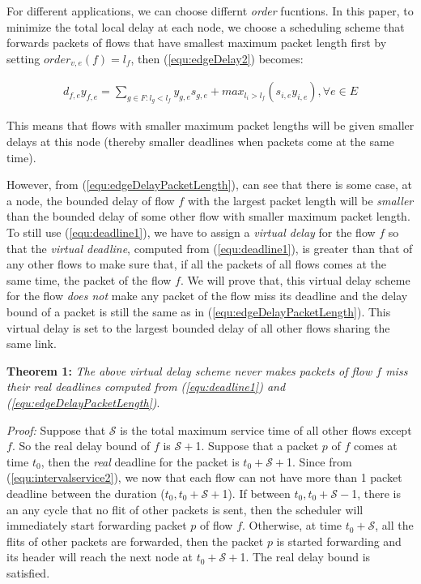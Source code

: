 \documentclass[conference, twocolumn]{IEEEtran}
\theoremstyle{definition}
\begin{document}
For different applications, we can choose differnt {\em order} fucntions. In
this paper, to minimize the total local delay at each node, we choose a
scheduling scheme that forwards packets of flows that have smallest maximum
packet length first by setting $order_{v,e}(f)=l_f$, then
(\ref{equ:edgeDelay2}) becomes:

\begin{eqnarray}\label{equ:edgeDelayPacketLength}
d_{f,e}y_{f,e} = \sum_{g \in F:l_g <
l_f}y_{g,e}s_{g,e} +max_{l_i>l_f}(s_{i,e}y_{i,e}), \forall e \in E
\end{eqnarray}

This means that flows with smaller maximum packet lengths will be given smaller
delays at this node (thereby smaller deadlines when packets come at the same
time).

However, from (\ref{equ:edgeDelayPacketLength}), can see that there is some
case, at a node, the bounded delay of flow $f$ with the largest packet length
will be {\em smaller} than the bounded delay of some other flow with smaller
maximum packet length. To still use (\ref{equ:deadline1}), we have to assign a
{\em virtual delay} for the flow $f$ so that the {\em virtual deadline},
computed from (\ref{equ:deadline1}), is greater than that of any other flows to
make sure that, if all the packets of all flows comes at the same time, the
packet of the flow $f$. We will prove that, this virtual delay scheme for the
flow {\em does not} make any packet of the flow miss its deadline and the delay
bound of a packet is still the same as in (\ref{equ:edgeDelayPacketLength}).
This virtual delay is set to the largest bounded delay of all other flows
sharing the same link.

{\textbf{Theorem 1:}} {\em  The above virtual delay scheme never makes
packets of flow $f$ miss their real deadlines computed from
(\ref{equ:deadline1}) and (\ref{equ:edgeDelayPacketLength})}.

{\em Proof:} Suppose that $\mathcal{S}$ is the total maximum service time of all
other flows except $f$. So the real delay bound of $f$ is $\mathcal{S}+$1.
Suppose that a packet $p$ of $f$ comes at time $t_0$, then the {\em real}
deadline for the packet is $t_0+\mathcal{S}+$1. Since from
(\ref{equ:intervalservice2}), we now that each flow can not have more than 1
packet deadline between the duration ($t_0, t_0+\mathcal{S}+$1). If between
$t_0, t_0+\mathcal{S} -$1, there is an any cycle that no flit of other packets is
sent, then the scheduler will immediately start forwarding packet $p$ of flow $f$.
Otherwise, at time $t_0+\mathcal{S}$, all the flits of other packets are
forwarded, then the packet $p$ is started forwarding and its header will reach
the next node at $t_0+\mathcal{S}+$1. The real delay bound is satisfied.
\end{document}
